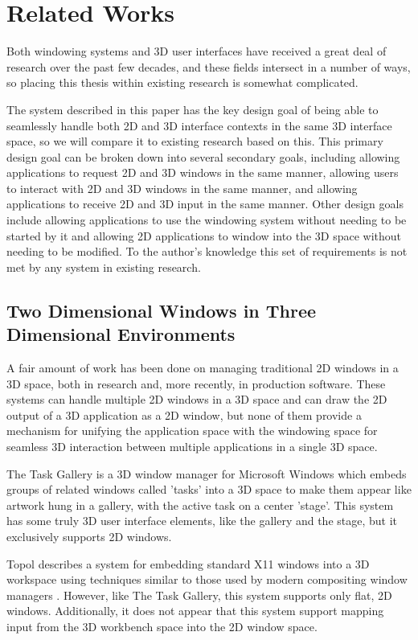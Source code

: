 \chapter{Related Works}

Both windowing systems and 3D user interfaces have received a great deal of research over the past few decades, and these fields intersect in a number of ways, so placing this thesis within existing research is somewhat complicated. 

The system described in this paper has the key design goal of being able to seamlessly handle both 2D and 3D interface contexts in the same 3D interface space, so we will compare it to existing research based on this. This primary design goal can be broken down into several secondary goals, including allowing applications to request 2D and 3D windows in the same manner, allowing users to interact with 2D and 3D windows in the same manner, and allowing applications to receive 2D and 3D input in the same manner. Other design goals include allowing applications to use the windowing system without needing to be started by it and allowing 2D applications to window into the 3D space without needing to be modified. To the author's knowledge this set of requirements is not met by any system in existing research.

\section{Two Dimensional Windows in Three Dimensional Environments}
A fair amount of work has been done on managing traditional 2D windows in a 3D space, both in research and, more recently, in production software. These systems can handle multiple 2D windows in a 3D space and can draw the 2D output of a 3D application as a 2D window, but none of them provide a mechanism for unifying the application space with the windowing space for seamless 3D interaction between multiple applications in a single 3D space.

The Task Gallery \cite{task_gallery} is a 3D window manager for Microsoft Windows which embeds groups of related windows called 'tasks' into a 3D space to make them appear like artwork hung in a gallery, with the active task on a center 'stage'. This system has some truly 3D user interface elements, like the gallery and the stage, but it exclusively supports 2D windows. 

Topol describes a system for embedding standard X11 windows into a 3D workspace using techniques similar to those used by modern compositing window managers \cite{xwindow_immersion}. However, like The Task Gallery, this system supports only flat, 2D windows. Additionally, it does not appear that this system support mapping input from the 3D workbench space into the 2D window space.

